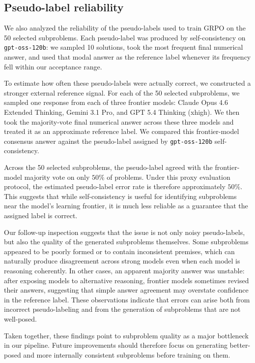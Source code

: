 \documentclass{article}
\begin{document}
\subsection{Pseudo-label reliability}

We also analyzed the reliability of the pseudo-labels used to train GRPO on the 50 selected subproblems. Each pseudo-label was produced by self-consistency on \texttt{gpt-oss-120b}: we sampled 10 solutions, took the most frequent final numerical answer, and used that modal answer as the reference label whenever its frequency fell within our acceptance range.

To estimate how often these pseudo-labels were actually correct, we constructed a stronger external reference signal. For each of the 50 selected subproblems, we sampled one response from each of three frontier models: Claude Opus 4.6 Extended Thinking, Gemini 3.1 Pro, and GPT 5.4 Thinking (xhigh). We then took the majority-vote final numerical answer across these three models and treated it as an approximate reference label. We compared this frontier-model consensus answer against the pseudo-label assigned by \texttt{gpt-oss-120b} self-consistency.

Across the 50 selected subproblems, the pseudo-label agreed with the frontier-model majority vote on only $50\%$ of problems. Under this proxy evaluation protocol, the estimated pseudo-label error rate is therefore approximately $50\%$. This suggests that while self-consistency is useful for identifying subproblems near the model's learning frontier, it is much less reliable as a guarantee that the assigned label is correct.

Our follow-up inspection suggests that the issue is not only noisy pseudo-labels, but also the quality of the generated subproblems themselves. Some subproblems appeared to be poorly formed or to contain inconsistent premises, which can naturally produce disagreement across strong models even when each model is reasoning coherently. In other cases, an apparent majority answer was unstable: after exposing models to alternative reasoning, frontier models sometimes revised their answers, suggesting that simple answer agreement may overstate confidence in the reference label. These observations indicate that errors can arise both from incorrect pseudo-labeling and from the generation of subproblems that are not well-posed.

Taken together, these findings point to subproblem quality as a major bottleneck in our pipeline. Future improvements should therefore focus on generating better-posed and more internally consistent subproblems before training on them.
\end{document}
